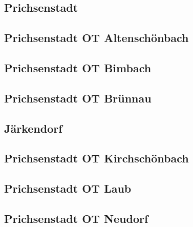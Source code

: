 \documentclass[fontsize=12pt,a4paper]{scrreprt}
\begin{document}
                \subsection{Prichsenstadt}
                
                
                \subsection{Prichsenstadt OT Altenschönbach}
                
                
                \subsection{Prichsenstadt OT Bimbach}
                
                
                \subsection{Prichsenstadt OT Brünnau}
                
                
                \subsection{Järkendorf}
                
                
                \subsection{Prichsenstadt OT Kirchschönbach}
                
                
                \subsection{Prichsenstadt OT Laub}
                
                
                \subsection{Prichsenstadt OT Neudorf}
                
                
\end{document}
